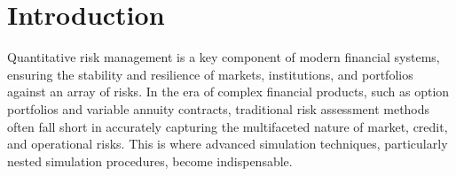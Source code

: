 \chapter{Introduction}

Quantitative risk management is a key component of modern financial systems, ensuring the stability and resilience of markets, institutions, and portfolios against an array of risks. In the era of complex financial products, such as option portfolios and variable annuity contracts, traditional risk assessment methods often fall short in accurately capturing the multifaceted nature of market, credit, and operational risks. This is where advanced simulation techniques, particularly nested simulation procedures, become indispensable.